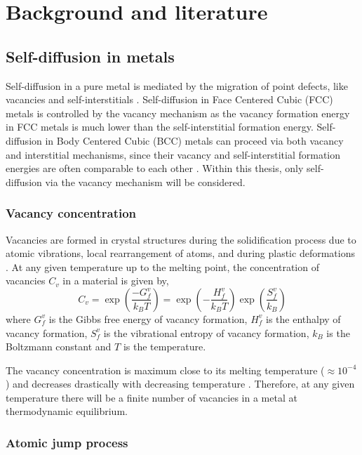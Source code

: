 \documentclass{article}
\begin{document}
\section{Background and literature}

\subsection{Self-diffusion in metals}

Self-diffusion in a pure metal is mediated by the migration of point defects, like vacancies and self-interstitials \cite{Shewmon2016}. Self-diffusion in Face Centered Cubic (FCC) metals is controlled by the vacancy mechanism \cite{Mehrer1978} as the vacancy formation energy in FCC metals is much lower than the self-interstitial formation energy. Self-diffusion in Body Centered Cubic (BCC) metals can proceed via both vacancy and interstitial mechanisms, since their vacancy and self-interstitial formation energies are often comparable to each other \cite{Mendelev2007}. Within this thesis, only self-diffusion via the vacancy mechanism will be considered.

\subsubsection{Vacancy concentration}

Vacancies are formed in crystal structures during the solidification process due to atomic vibrations, local rearrangement of atoms, and during plastic deformations \cite{Ehrhart1992}. At any given temperature up to the melting point, the concentration of vacancies $C_v$ in a material is given by,
%
\begin{equation} \label{eq:1}
C_v = \exp\left(\dfrac{-G^v_f}{k_B T}\right) = \exp\left(-\dfrac{H^v_f}{k_B T}\right) \exp\left(\dfrac{S^v_f}{k_B}\right)
\end{equation}
%
where $G^v_f$ is the Gibbs free energy of vacancy formation, $H^v_f$ is the enthalpy of vacancy formation, $S^v_f$ is the vibrational entropy of vacancy formation, $k_B$ is the Boltzmann constant and $T$ is the temperature. 

The vacancy concentration is maximum close to its melting temperature ($\approx10^{-4}$) and decreases drastically with decreasing temperature \cite{Gottstein2004}. Therefore, at any given temperature there will be a finite number of vacancies in a metal at thermodynamic equilibrium.

\subsubsection{Atomic jump process}
\end{document}
